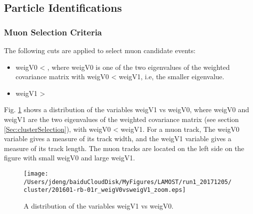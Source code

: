\documentclass[12pt,twoside,letterpaper]{article}
\begin{document}
\subsection{Particle Identifications} 

\subsubsection{Muon Selection Criteria} 
The following cuts are applied to select muon candidate events: 

       \begin{itemize}
	    \item weigV0 <     , where weigV0 is one of the two
	    eigenvalues of the weighted covariance matrix with weigV0
	    < weigV1, i.e, the smaller eigenvalue.
	    \item weigV1 >  
       \end{itemize}

Fig. \ref{Fig:weigV1vsweigV0} shows a distribution of the variables weigV1 vs weigV0, where weigV0 and weigV1 are the two eigenvalues of the weighted covariance matrix (see section \ref{Sec:clusterSelection}), with weigV0 < weigV1.
For a muon track, The weigV0 variable gives a measure of its track width, and the weigV1 variable gives a measure of its track length.  The muon tracks are located on the left side on the figure with small weigV0 and large weigV1. 

   \begin{figure}[!htbp]
   \begin{center}
       \texttt{[image: /Users/jdeng/baiduCloudDisk/MyFigures/LAMOST/run1\_20171205/cluster/201601-rb-01r\_weigV0vsweigV1\_zoom.eps]}
       \caption{A distribution of the variables weigV1 vs weigV0. }
       \label{Fig:weigV1vsweigV0}
   \end{center}    
   \end{figure}
\end{document}
